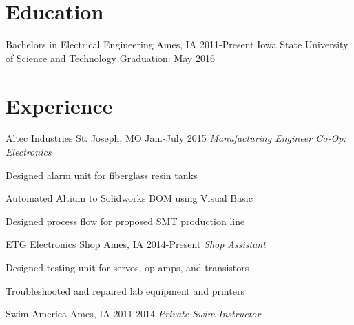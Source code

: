 \documentclass[]{friggeri-cv} %
\begin{document}
\section{Education}
\begin{entrylist}
\entry
{Bachelors in Electrical Engineering}
{Ames, IA}
{2011-Present}
{Iowa State University of Science and Technology}
{Graduation: May 2016}

\end{entrylist}
\section{Experience}
\begin{entrylist}
\entry
{Altec Industries}
{St. Joseph, MO}
{Jan.-July 2015}
{\emph{Manufacturing Engineer Co-Op: Electronics}}
{\begin{itemizenosep}
	\item Designed alarm unit for fiberglass resin tanks
	\item Automated Altium to Solidworks BOM using Visual Basic
	\item Designed process flow for proposed SMT production line
\end{itemizenosep}}
\entry
{ETG Electronics Shop}
{Ames, IA}
{2014-Present}
{\emph{Shop Assistant}}
{\begin{itemizenosep}
	\item Designed testing unit for servos, op-amps, and transistors
	\item Troubleshooted and repaired lab equipment and printers
\end{itemizenosep}}
\entry
{Swim America}
{Ames, IA}
{2011-2014}
{\emph{Private Swim Instructor}}
{}
\end{entrylist}
\end{document}
